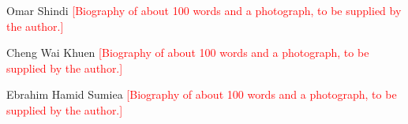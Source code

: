 \documentclass{ieeeaccess}
\newcounter{biography}  %
\newcommand{\authorinput}[1]{\textcolor{red}{[#1]}}
\begin{document}
\begin{IEEEbiography}{Omar Shindi}
\authorinput{Biography of about 100 words and a photograph, to be supplied by the author.}
\end{IEEEbiography}

\begin{IEEEbiography}{Cheng Wai Khuen}
\authorinput{Biography of about 100 words and a photograph, to be supplied by the author.}
\end{IEEEbiography}

\begin{IEEEbiography}{Ebrahim Hamid Sumiea}
\authorinput{Biography of about 100 words and a photograph, to be supplied by the author.}
\end{IEEEbiography}

\EOD
\end{document}
